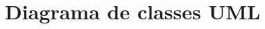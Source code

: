 \documentclass[a4paper]{article}
\begin{document}
















\section{Diagrama de classes UML}


\clearpage
{}
\renewcommand\refname{Bibliografia}


\end{document}
